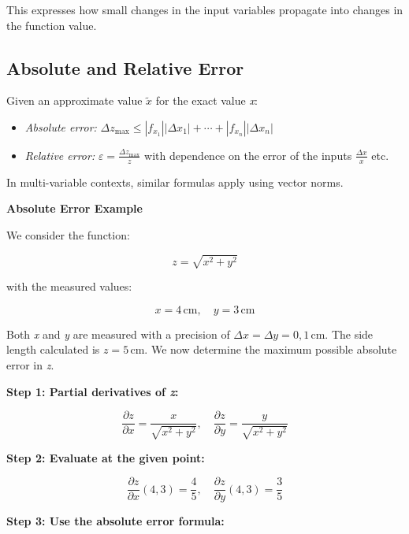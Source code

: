 This expresses how small changes in the input variables propagate into changes in the function value.


\subsection{Absolute and Relative Error}

Given an approximate value \( \tilde{x} \) for the exact value \emph{x}:

\begin{itemize}

    \item \emph{Absolute error:} \(\Delta z_{\max} \le |f_{x_1}||\Delta x_1| + \cdots + |f_{x_n}|
          |\Delta x_n| \)

    \item \emph{Relative error:} \( \varepsilon = \frac{\Delta z_{\max}}{z}\) with dependence on the error 
          of the inputs \(\frac{\Delta x}{x}\) etc.

\end{itemize}


In multi-variable contexts, similar formulas apply using vector norms.
\vspace{\baselineskip}

\textbf{Absolute Error Example}
\vspace{\baselineskip}

We consider the function:

\[
    z = \sqrt{x^2 + y^2}
\]

with the measured values:

\[
    x = 4 \, \text{cm}, \quad y = 3 \, \text{cm}
\]

Both \emph{x} and \emph{y} are measured with a precision of \( \Delta x = \Delta y = 0{,}1 \, \text{cm} \). 
The side length calculated is \( z = 5 \, \text{cm} \). We now determine the maximum possible absolute 
error in \emph{z}.

\textbf{Step 1: Partial derivatives of \emph{z}:}

\[
    \frac{\partial z}{\partial x} = \frac{x}{\sqrt{x^2 + y^2}}, \quad
    \frac{\partial z}{\partial y} = \frac{y}{\sqrt{x^2 + y^2}}
\]

\textbf{Step 2: Evaluate at the given point:}

\[
    \frac{\partial z}{\partial x}(4, 3) = \frac{4}{5}, \quad
    \frac{\partial z}{\partial y}(4, 3) = \frac{3}{5}
\]

\textbf{Step 3: Use the absolute error formula:}

